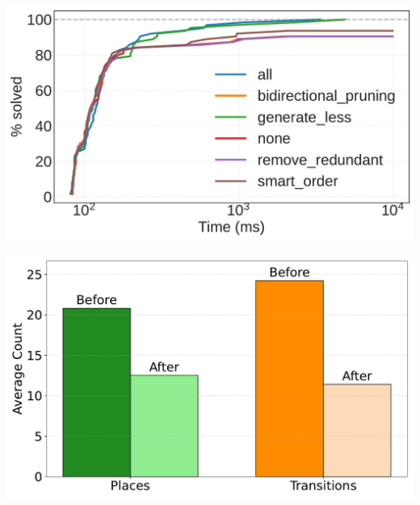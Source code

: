 \begin{center}
		\begin{minipage}[t]{0.48\textwidth}
		\centering
		\includegraphics[width=\linewidth]{plots/timeout_10000_cumulative_solved_log.pdf}
		\label{fig:timeout_cumulative_solved_log}
	\end{minipage}\hfill
	\begin{minipage}[t]{0.48\textwidth}
		\centering
		\includegraphics[width=\linewidth]{plots/petri_size_reduction_plot.pdf}
		\label{fig:petri_size_reduction}
	\end{minipage}
\end{center}




